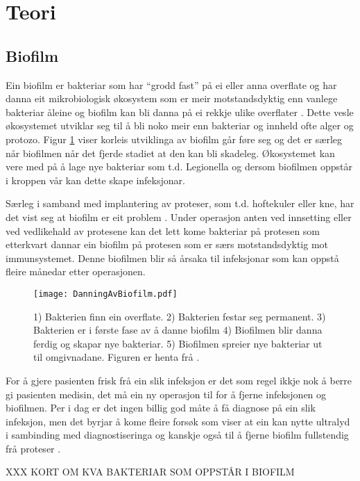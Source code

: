 \section{Teori}
\subsection{Biofilm}
Ein biofilm er bakteriar som har ``grodd fast'' på ei eller anna overflate og har danna eit mikrobiologisk økosystem som er meir motstandsdyktig enn vanlege bakteriar åleine og biofilm kan bli danna på ei rekkje ulike overflater \cite{biofilm}\cite{biofilm2}. Dette vesle økosystemet utviklar seg til å bli noko meir enn bakteriar og innheld ofte alger og protozo. Figur \ref{fig:biofilm} viser korleis utviklinga av biofilm går føre seg og det er særleg når biofilmen når det fjerde stadiet at den kan bli skadeleg. Økosystemet kan vere med på å lage nye bakteriar som t.d. Legionella \cite{biofilm} og dersom biofilmen oppstår i kroppen vår kan dette skape infeksjonar.

Særleg i samband med implantering av proteser, som t.d. hoftekuler eller kne, har det vist seg at biofilm er eit problem \cite{ultraprotese}. Under operasjon anten ved innsetting eller ved vedlikehald av protesene kan det lett kome bakteriar på protesen som etterkvart dannar ein biofilm på protesen som er særs motstandsdyktig mot immunsystemet. Denne biofilmen blir så årsaka til infeksjonar som kan oppstå fleire månedar etter operasjonen. 

\begin{figure}[htbp]
  \texttt{[image: DanningAvBiofilm.pdf]}
  \caption{1) Bakterien finn ein overflate. 2) Bakterien festar seg permanent. 3) Bakterien er i første fase av å danne biofilm 4) Biofilmen blir danna ferdig og skapar nye bakteriar. 5) Biofilmen spreier nye bakteriar ut til omgivnadane. Figuren er henta frå \cite{biofilmfigur}.}
  \label{fig:biofilm}
\end{figure}

For å gjere pasienten frisk frå ein slik infeksjon er det som regel ikkje nok å berre gi pasienten medisin, det må ein ny operasjon til for å fjerne infeksjonen og biofilmen\cite{infection}. Per i dag er det ingen billig god måte å få diagnose på ein slik infeksjon, men det byrjar å kome fleire forsøk som viser at ein kan nytte ultralyd i sambinding med diagnostiseringa og kanskje også til å fjerne biofilm fullstendig frå proteser \cite{ultraprotese}.

XXX KORT OM KVA BAKTERIAR SOM OPPSTÅR I BIOFILM
